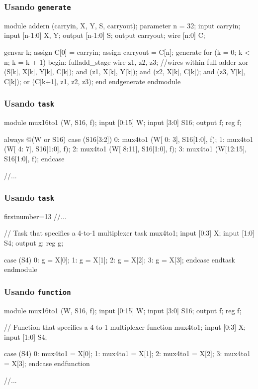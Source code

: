 \begin{frame}[fragile]
	\frametitle{Usando \texttt{generate}}
	\begin{verilogcode}
module addern (carryin, X, Y, S, carryout); 
  parameter n = 32;
  input carryin;
  input [n-1:0] X, Y;
  output [n-1:0] S; 
  output carryout; 
  wire [n:0] C;

  genvar k;  
  assign C[0] = carryin; 
  assign carryout = C[n]; 
  generate
    for (k = 0; k < n; k = k + 1) 
    begin: fulladd_stage
      wire z1, z2, z3; //wires within full-adder 
      xor (S[k], X[k], Y[k], C[k]);
      and (z1, X[k], Y[k]);
      and (z2, X[k], C[k]);
      and (z3, Y[k], C[k]);
      or (C[k+1], z1, z2, z3); 
    end
  endgenerate 
endmodule
    \end{verilogcode} 
\end{frame}

\begin{frame}[fragile]
	\frametitle{Usando \texttt{task}}
	\begin{verilogcode}
module mux16to1 (W, S16, f); 
  input [0:15] W;
  input [3:0] S16;
  output f;
  reg f;

  always @(W or S16) 
    case (S16[3:2])
      0: mux4to1 (W[ 0: 3], S16[1:0], f); 
      1: mux4to1 (W[ 4: 7], S16[1:0], f); 
      2: mux4to1 (W[ 8:11], S16[1:0], f); 
      3: mux4to1 (W[12:15], S16[1:0], f);
    endcase

//...
    \end{verilogcode} 
\end{frame}

\begin{frame}[fragile]
	\frametitle{Usando \texttt{task}}
	\begin{verilogcode*}{firstnumber=13}
//...

  // Task that specifies a 4-to-1 multiplexer 
  task mux4to1;
    input [0:3] X; 
    input [1:0] S4; 
    output g;
    reg g;

    case (S4)
      0: g = X[0];
      1: g = X[1]; 
      2: g = X[2]; 
      3: g = X[3];
    endcase 
  endtask
endmodule
    \end{verilogcode*} 
\end{frame}

\begin{frame}[fragile]
	\frametitle{Usando \texttt{function}}
	\begin{verilogcode}
module mux16to1 (W, S16, f); 
  input [0:15] W;
  input [3:0] S16;
  output f;
  reg f;
  
  // Function that specifies a 4-to-1 multiplexer 
  function mux4to1;
    input [0:3] X; 
    input [1:0] S4;

    case (S4)
      0: mux4to1 = X[0]; 
      1: mux4to1 = X[1]; 
      2: mux4to1 = X[2]; 
      3: mux4to1 = X[3];
    endcase 
  endfunction
  
//...
    \end{verilogcode} 
\end{frame}

